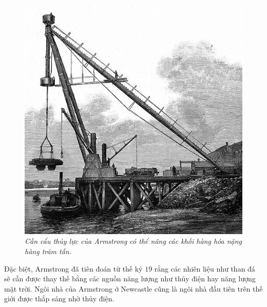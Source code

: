 \begin{multicols}{2}
\begin{figure}[H]
		\includegraphics[width= 1\linewidth]{28}
		\caption{\small\textit{\color{timhieukhoahoc}Cần cẩu thủy lực của Armstrong có thể nâng các khối hàng hóa nặng hàng trăm tấn.}}
		\vspace*{-10pt}
	\end{figure}
	Đặc biệt, Armstrong đã tiên đoán từ thế kỷ $19$ rằng các nhiên liệu như than đá sẽ cần được thay thế bằng các nguồn năng lượng như thủy điện hay năng lượng mặt trời. Ngôi nhà của Armstrong ở Newcastle cũng là ngôi nhà đầu tiên trên thế giới được thắp sáng nhờ thủy điện.
	\begin{figure}[H]
		\vspace*{-5pt}
		\centering
		\captionsetup{labelformat= empty, justification=centering}

\end{figure}
\end{multicols}
